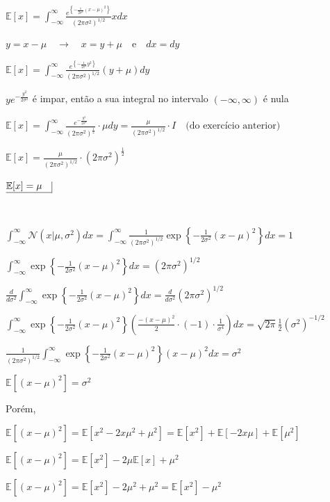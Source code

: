 \begin{enumerate}
$\mathbb{E}[x]=\int_{-\infty}^{\infty} \frac{e^{\left\{-\frac{1}{2 \sigma^2}(x-\mu)^2\right\}}}{\left(2 \pi \sigma^2\right)^{1/2}} x d x$ 

$y=x-\mu \quad \rightarrow \quad x=y+\mu \quad \text{e} \quad d x=d y$ 

$\mathbb{E}[x]=\int_{-\infty}^{\infty} \frac{e^{\left\{-\frac{1}{2 \sigma^2} y^2\right\}}}{\left(2 \pi \sigma^2\right)^{1 / 2}}(y+\mu) d y$ 

 $y e^{-\frac{y^2}{2 \sigma^2}} $ é impar, então a sua integral no intervalo $(-\infty, \infty)$ é nula 

$\mathbb{E}[x]=\int_{-\infty}^{\infty} \frac{e^{-\frac{y^2}{2 \sigma^2}}}{\left(2 \pi \sigma^2\right)^{\frac{1}{2}}} \cdot \mu d y=\frac{\mu}{\left(2 \pi \sigma^2\right)^{1 / 2}} \cdot I \quad \text{(do exercício anterior)}$ 

$\mathbb{E}[x]=\frac{\mu}{\left(2 \pi \sigma^2\right)^{1 / 2}} \cdot\left(2 \pi \sigma^2\right)^{\frac{1}{2}}$

$\underline{\mathbb{E}[x]=\mu \quad} \vline$

$ $


$ \int_{-\infty}^{\infty}\mathcal{N}(x | \mu, \sigma^2)dx=  \int_{-\infty}^{\infty} \frac{1}{(2\pi\sigma^2)^{1/2}}\exp\left\{ -\frac{1}{2\sigma^2}(x - \mu)^2 \right\} dx = 1 $

$ \int_{-\infty}^{\infty} \exp\left\{ -\frac{1}{2\sigma^2}(x - \mu)^2 \right\} dx = (2\pi\sigma^2)^{1/2} $

$ \frac{d}{d \sigma^2} \int_{-\infty}^{\infty} \exp\left\{ -\frac{1}{2\sigma^2}(x - \mu)^2 \right\} dx = \frac{d}{d \sigma^2} (2\pi\sigma^2)^{1/2} $

$ \int_{-\infty}^{\infty} \exp\left\{ -\frac{1}{2\sigma^2}(x - \mu)^2 \right\} \left( \frac{-(x-\mu)^2}{2} \cdot (-1) \cdot \frac{1}{\sigma^4} \right) dx = \sqrt{2\pi}\frac{1}{2}(\sigma^2)^{-1/2} $

$ \frac{1}{(2\pi\sigma^2)^{1/2}} \int_{-\infty}^{\infty} \exp\left\{ -\frac{1}{2\sigma^2}(x - \mu)^2 \right\} (x-\mu)^2 dx = \sigma^2 $

$\mathbb{E}[(x-\mu)^2] = \sigma^2$

Porém,

$\mathbb{E}[(x-\mu)^2] = \mathbb{E}[x^2-2x\mu^2+\mu^2] =  \mathbb{E}[x^2]+\mathbb{E}[-2x\mu]+ \mathbb{E}[\mu^2]$

$\mathbb{E}[(x-\mu)^2] = \mathbb{E}[x^2]-2\mu\mathbb{E}[x] +\mu^2$

$\mathbb{E}[(x-\mu)^2] = \mathbb{E}[x^2]-2\mu^2 +\mu^2 = \mathbb{E}[x^2]-\mu^2$


\end{enumerate}
